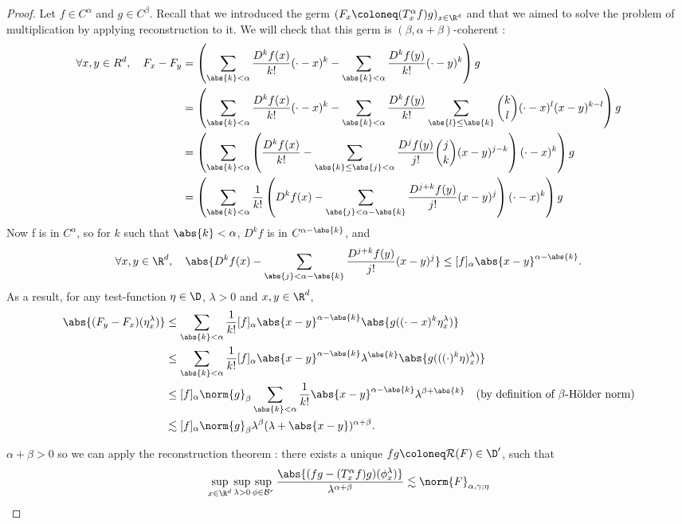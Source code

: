 \begin{proof}
    Let $f\in C^\alpha$ and $g\in C^\beta$. Recall that we introduced the germ $(F_x \coloneq (T_x^\alpha f)g)_{x\in \R^d}$ and that we aimed to solve the problem of multiplication by applying reconstruction to it.
    We will check that this germ is $(\beta, \alpha+\beta)$-coherent :
    \begin{align*}
        \forall x,y \in R^d, \quad F_x - F_y &= \left( \sum_{\abs{k}<\alpha} \frac{D^kf(x)}{k!} (\cdot - x)^k - \sum_{\abs{k}<\alpha} \frac{D^kf(y)}{k!} (\cdot - y)^k \right) g \\
        &= \left( \sum_{\abs{k}<\alpha} \frac{D^kf(x)}{k!} (\cdot - x)^k - \sum_{\abs{k}<\alpha} \frac{D^kf(y)}{k!} \sum_{\abs{l}\leq \abs{k}} \binom{k}{l} (\cdot -x)^{l}(x-y)^{k-l} \right) g \\
        &= \left( \sum_{\abs{k}<\alpha} \left(\frac{D^kf(x)}{k!} - \sum_{\abs{k}\leq \abs{j} < \alpha} \frac{D^jf(y)}{j!} \binom{j}{k} (x-y)^{j-k} \right) (\cdot - x)^k \right) g \\
        &= \left( \sum_{\abs{k}<\alpha} \frac{1}{k!} \left(D^kf(x) - \sum_{\abs{j} < \alpha - \abs{k}}  \frac{D^{j+k} f(y)}{j!} (x-y)^{j} \right) (\cdot - x)^k \right) g \\
    \end{align*}
    Now f is in $C^\alpha$, so for $k$ such that $\abs{k}<\alpha$, $D^kf$ is in $C^{\alpha - \abs{k}}$, and
    $$\forall x,y \in \R^d, \quad\abs{D^kf(x) - \sum_{\abs{j} < \alpha - \abs{k}}  \frac{D^{j+k} f(y)}{j!} (x-y)^{j}} \leq [f]_{\alpha} \abs{x-y}^{\alpha -\abs{k}}.$$
    As a result, for any test-function $\eta\in \D$, $\lambda>0$ and $x,y\in \R^d$,
    \begin{align*}
        \abs{(F_y - F_x)(\eta^\lambda_x)} &\leq \sum_{\abs{k}<\alpha} \frac{1}{k!} [f]_{\alpha} \abs{x-y}^{\alpha -\abs{k}} \abs{g((\cdot - x)^k \eta^\lambda_x)} \\
        &\leq \sum_{\abs{k}<\alpha} \frac{1}{k!} [f]_{\alpha} \abs{x-y}^{\alpha -\abs{k}} \lambda^{\abs{k}} \abs{g(((\cdot)^k \eta)^\lambda_x)} \\
        &\leq [f]_{\alpha} \norm{g}_\beta \sum_{\abs{k}<\alpha} \frac{1}{k!} \abs{x-y}^{\alpha -\abs{k}} \lambda^{\beta + \abs{k}}  \quad (\text{by definition of }\beta\text{-Hölder norm})\\
        &\lesssim [f]_{\alpha} \norm{g}_\beta \lambda^\beta (\lambda + \abs{x-y})^{\alpha+\beta}.
    \end{align*}
    
    $\alpha+\beta>0$ so we can apply the reconstruction theorem : there exists a unique $fg \coloneq \mathcal{R}(F)\in \D'$, such that
    \begin{equation*}
        \sup_{x\in \R^d} \sup_{\lambda > 0} \sup_{\phi \in \mathcal{B}^r} \frac{\abs{(fg - (T_x^\alpha f) g)(\phi_x^\lambda)}}{\lambda^{\alpha+\beta}} \lesssim \norm{F}_{\alpha,\gamma;\eta}
    \end{equation*}


\end{proof}
